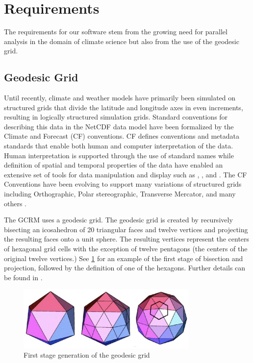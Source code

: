 \section{Requirements}
\label{section:requirements}

The requirements for our software stem from the growing need for parallel
analysis in the domain of climate science\cite{MODSIM07:LOT} but also from
the use of the geodesic grid.

\subsection{Geodesic Grid}
\label{subsection:grid}

Until recently, climate and weather models have primarily been simulated on
structured grids that divide the latitude and longitude axes in even
increments, resulting in logically structured simulation grids. Standard
conventions for describing this data in the NetCDF data model have been
formalized by the Climate and Forecast (CF) conventions. CF defines
conventions and metadata standards that enable both human and computer
interpretation of the data.  Human interpretation is supported through the use
of standard names while definition of spatial and temporal properties of the
data have enabled an extensive set of tools for data manipulation and display
such as \cite{NCO}, \cite{OPeNDAP}, and \cite{FERRET}.  The CF Conventions
have been evolving to support many variations of structured grids including
Orthographic, Polar stereographic, Transverse Mercator, and many others . 

The GCRM uses a geodesic grid.  The geodesic grid is created by recursively
bisecting an icosahedron of 20 triangular faces and twelve vertices and
projecting the resulting faces onto a unit sphere.  The resulting vertices
represent the centers of hexagonal grid cells with the exception of twelve
pentagons (the centers of the original twelve vertices.) See
\ref{fig:geodesic} for an example of the first stage of bisection and
projection, followed by the definition of one of the hexagons.  Further
details can be found in \cite{GEODESIC}.

\begin{figure}[!t]
\center
\includegraphics[width=3.5in]{images/geodesic2}
\caption{First stage generation of the geodesic grid}
\label{fig:geodesic}
\end{figure}

